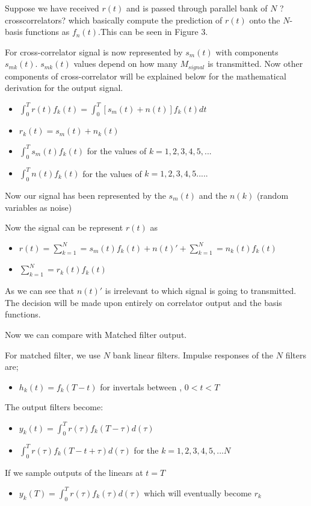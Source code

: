 {Suppose we have received $r(t)$ and is passed through parallel bank of $N$ ?crosscorrelators? which basically compute the prediction of $r(t)$ onto the $N$-basis functions as $f_n(t)$.This  can be seen in Figure 3.

For cross-correlator  signal is now represented by $s_m(t)$ with components $s_{mk}(t)$. $s_{mk}(t)$ values depend on how many $M_{signal}$ is transmitted. Now other components of cross-correlator will be explained below for the mathematical derivation for  the output signal.

\begin{itemize}
	\item $\int_{0}^{T} r(t) f_k(t)=\int_{0}^{T} [s_m(t)+n(t)] f_k(t) dt$
	\item $r_k(t)=s_m(t)+n_k(t)$
	\item $\int_{0}^{T} s_m(t) f_k(t) $ for the values of $k= 1,2,3,4,5,...$
	\item $\int_{0}^{T} n(t) f_k(t) $ for the values of $k=1,2,3,4,5.....$
\end{itemize}

Now our signal has been represented by the $s_m(t)$ and the $n(k)$ (random variables as noise)

Now the signal can be represent $r(t)$ as

\begin{itemize}
	\item $r(t)= \sum\limits_{k=1}^N = s_m(t) f_k(t)+ n(t)'+\sum\limits_{k=1}^N = n_k(t) f_k(t)$
	\item $\sum\limits_{k=1}^N = r_k(t) f_k(t)$
\end{itemize}

As we can see that $n(t)'$ is irrelevant to which signal is going to transmitted. The decision will be made upon entirely on correlator output and the basis functions. 

Now we can compare with Matched filter output. 

For matched filter, we use $N$ bank linear filters. Impulse responses of the $N$ filters are;
\begin{itemize}
	\item $h_k(t)=f_k(T-t)$ for invertals between , $0<t<T$
\end{itemize}

The output filters become:
\begin{itemize}
	\item $y_k(t)=\int_{0}^{T} r(\tau) f_k(T-\tau)d(\tau)$
	\item $\int_{0}^{T} r(\tau) f_k(T-t+\tau)d(\tau)$ for the $k= 1,2,3,4,5,...N$
\end{itemize}
If we sample outputs of the linears at $t=T$
\begin{itemize}
\item $y_k(T)=\int_{0}^{T} r(\tau) f_k(\tau)d(\tau)$ which will eventually become $r_k$
\end{itemize}

}
